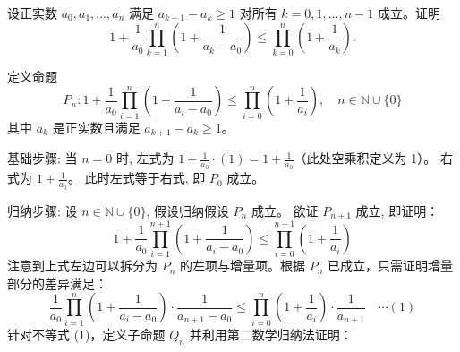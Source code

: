 \begin{questions}

\question 设正实数 $a_0, a_1, \dots, a_n$ 满足 $a_{k+1} - a_k \ge 1$ 对所有 $k = 0,1,\dots,n-1$ 成立。证明
\[
1 + \frac{1}{a_0}\prod_{k=1}^{n} \left(1+\frac{1}{a_k-a_0}\right) \le \prod_{k=0}^{n} \left(1+\frac{1}{a_k}\right).
\]
\begin{solution}
    定义命题 
\[
P_n: 1 + \frac{1}{a_0} \prod_{i=1}^n \left(1 + \frac{1}{a_i - a_0}\right) \le \prod_{i=0}^n \left(1 + \frac{1}{a_i}\right), \quad n \in \mathbb{N} \cup \{0\}
\]
其中 $a_k$ 是正实数且满足 $a_{k+1} - a_k \ge 1$。

基础步骤: 当 $n=0$ 时, 
左式为 $1 + \frac{1}{a_0} \cdot (1) = 1 + \frac{1}{a_0}$（此处空乘积定义为 1）。
右式为 $1 + \frac{1}{a_0}$。
此时左式等于右式, 即 $P_0$ 成立。

归纳步骤: 设 $n \in \mathbb{N} \cup \{0\}$, 假设归纳假设 $P_n$ 成立。
欲证 $P_{n+1}$ 成立, 即证明：
\[
1 + \frac{1}{a_0} \prod_{i=1}^{n+1} \left(1 + \frac{1}{a_i - a_0}\right) \le \prod_{i=0}^{n+1} \left(1 + \frac{1}{a_i}\right)
\]
注意到上式左边可以拆分为 $P_n$ 的左项与增量项。根据 $P_n$ 已成立，只需证明增量部分的差异满足：
\[
\frac{1}{a_0} \prod_{i=1}^{n} \left(1 + \frac{1}{a_i - a_0}\right) \cdot \frac{1}{a_{n+1} - a_0} \le \prod_{i=0}^{n} \left(1 + \frac{1}{a_i}\right) \cdot \frac{1}{a_{n+1}} \quad \cdots (1)
\]
针对不等式 (1)，定义子命题 $Q_n$ 并利用第二数学归纳法证明：


\end{solution}
\end{questions}
